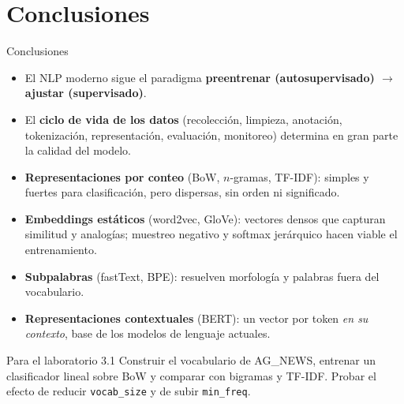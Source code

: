 \documentclass[aspectratio=169, 10pt]{beamer}
\begin{document}
\section{Conclusiones}

\begin{frame}{Conclusiones}

	\begin{itemize}
		\item El NLP moderno sigue el paradigma \textbf{preentrenar (autosupervisado) $\to$ ajustar (supervisado)}.

		\vspace{0.15cm}

		\item El \textbf{ciclo de vida de los datos} (recolecci\'on, limpieza, anotaci\'on, tokenizaci\'on, representaci\'on, evaluaci\'on, monitoreo) determina en gran parte la calidad del modelo.

		\vspace{0.15cm}

		\item \textbf{Representaciones por conteo} (BoW, $n$-gramas, TF-IDF): simples y fuertes para clasificaci\'on, pero dispersas, sin orden ni significado.

		\vspace{0.15cm}

		\item \textbf{Embeddings est\'aticos} (word2vec, GloVe): vectores densos que capturan similitud y analog\'ias; muestreo negativo y softmax jer\'arquico hacen viable el entrenamiento.

		\vspace{0.15cm}

		\item \textbf{Subpalabras} (fastText, BPE): resuelven morfolog\'ia y palabras fuera del vocabulario.

		\vspace{0.15cm}

		\item \textbf{Representaciones contextuales} (BERT): un vector por token \emph{en su contexto}, base de los modelos de lenguaje actuales.
	\end{itemize}

	\vspace{0.2cm}

	\begin{alertblock}{Para el laboratorio 3.1}
		Construir el vocabulario de AG\_NEWS, entrenar un clasificador lineal sobre BoW y comparar con bigramas y TF-IDF. Probar el efecto de reducir \texttt{vocab\_size} y de subir \texttt{min\_freq}.
	\end{alertblock}

\end{frame}
\end{document}
